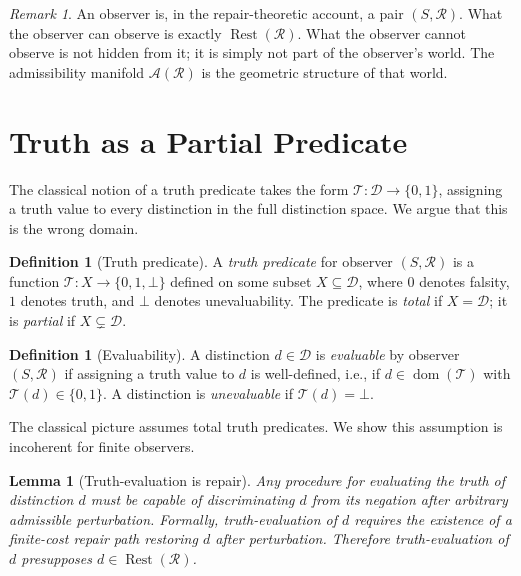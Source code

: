 \documentclass[12pt, oneside]{article}
\theoremstyle{plain}
\newtheorem{lemma}[theorem]{Lemma}
\theoremstyle{definition}
\newtheorem{definition}[theorem]{Definition}
\theoremstyle{remark}
\newtheorem{remark}[theorem]{Remark}
\DeclareMathOperator{\Rest}{Rest}
\newcommand{\AO}{\mathcal{A}}
\newcommand{\Dsub}{\mathcal{D}}
\newcommand{\Tsub}{\mathcal{T}}
\newcommand{\RestR}{\Rest(\mathcal{R})}
\newcommand{\Undef}{\mathord{\perp}} %
\begin{document}
\begin{remark}
  An observer is, in the repair-theoretic account, a pair
  $(S, \mathcal{R})$.
  What the observer can observe is exactly $\RestR$.
  What the observer cannot observe is not hidden from it; it is
  simply not part of the observer's world.
  The admissibility manifold $\AO(\mathcal{R})$ is the geometric
  structure of that world.
\end{remark}


\section{Truth as a Partial Predicate}
\label{sec:truth}

The classical notion of a truth predicate takes the form
$\Tsub: \Dsub \to \{0, 1\}$, assigning a truth value to every
distinction in the full distinction space.
We argue that this is the wrong domain.

\begin{definition}[Truth predicate]
  A \emph{truth predicate} for observer $(S, \mathcal{R})$ is a
  function $\Tsub: X \to \{0, 1, \Undef\}$ defined on some subset
  $X \subseteq \Dsub$, where $0$ denotes falsity, $1$ denotes
  truth, and $\Undef$ denotes unevaluability.
  The predicate is \emph{total} if $X = \Dsub$; it is
  \emph{partial} if $X \subsetneq \Dsub$.
\end{definition}

\begin{definition}[Evaluability]
  A distinction $d \in \Dsub$ is \emph{evaluable} by observer
  $(S, \mathcal{R})$ if assigning a truth value to $d$ is
  well-defined, i.e., if $d \in \operatorname{dom}(\Tsub)$ with
  $\Tsub(d) \in \{0,1\}$.
  A distinction is \emph{unevaluable} if $\Tsub(d) = \Undef$.
\end{definition}

The classical picture assumes total truth predicates.
We show this assumption is incoherent for finite observers.

\begin{lemma}[Truth-evaluation is repair]
  Any procedure for evaluating the truth of distinction $d$ must
  be capable of discriminating $d$ from its negation after
  arbitrary admissible perturbation.
  Formally, truth-evaluation of $d$ requires the existence of
  a finite-cost repair path restoring $d$ after perturbation.
  Therefore truth-evaluation of $d$ presupposes
  $d \in \RestR$.
  \label{lem:truth-is-repair}
\end{lemma}
\end{document}
